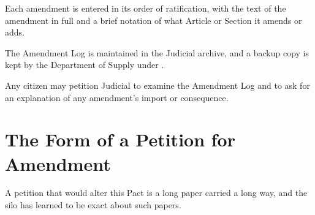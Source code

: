 \begin{clauses}
\item Each amendment is entered in its order of ratification, with the text of the amendment in full and a brief notation of what Article or Section it amends or adds.
\item The Amendment Log is maintained in the Judicial archive, and a backup copy is kept by the Department of Supply under .
\item Any citizen may petition Judicial to examine the Amendment Log and to ask for an explanation of any amendment's import or consequence.
\end{clauses}

\section{The Form of a Petition for Amendment}
\label{sec:amendment:form-of-a-petition-for-amendment}

A petition that would alter this Pact is a long paper carried a long way, and the silo has learned to be exact about such papers.

